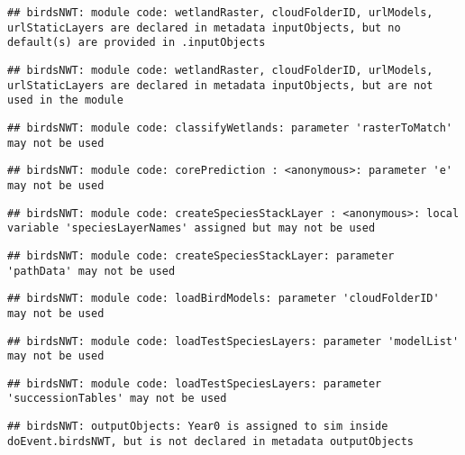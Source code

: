 \documentclass[]{article}
\begin{document}
\begin{verbatim}
## birdsNWT: module code: wetlandRaster, cloudFolderID, urlModels, urlStaticLayers are declared in metadata inputObjects, but no default(s) are provided in .inputObjects
\end{verbatim}

\begin{verbatim}
## birdsNWT: module code: wetlandRaster, cloudFolderID, urlModels, urlStaticLayers are declared in metadata inputObjects, but are not used in the module
\end{verbatim}

\begin{verbatim}
## birdsNWT: module code: classifyWetlands: parameter 'rasterToMatch' may not be used
\end{verbatim}

\begin{verbatim}
## birdsNWT: module code: corePrediction : <anonymous>: parameter 'e' may not be used
\end{verbatim}

\begin{verbatim}
## birdsNWT: module code: createSpeciesStackLayer : <anonymous>: local variable 'speciesLayerNames' assigned but may not be used
\end{verbatim}

\begin{verbatim}
## birdsNWT: module code: createSpeciesStackLayer: parameter 'pathData' may not be used
\end{verbatim}

\begin{verbatim}
## birdsNWT: module code: loadBirdModels: parameter 'cloudFolderID' may not be used
\end{verbatim}

\begin{verbatim}
## birdsNWT: module code: loadTestSpeciesLayers: parameter 'modelList' may not be used
\end{verbatim}

\begin{verbatim}
## birdsNWT: module code: loadTestSpeciesLayers: parameter 'successionTables' may not be used
\end{verbatim}

\begin{verbatim}
## birdsNWT: outputObjects: Year0 is assigned to sim inside doEvent.birdsNWT, but is not declared in metadata outputObjects
\end{verbatim}
\end{document}
